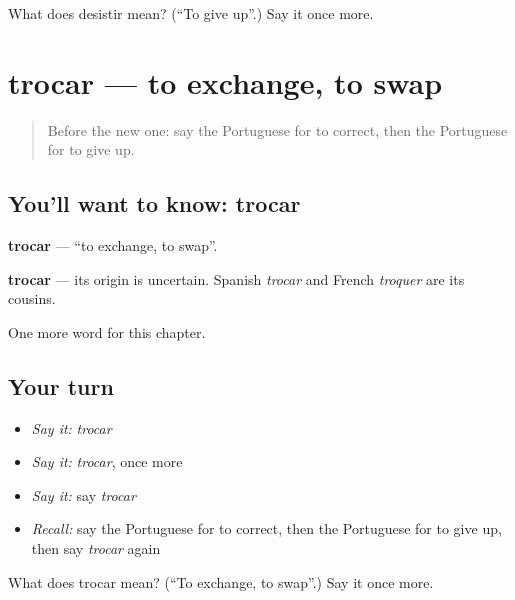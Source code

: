\begin{tcolorbox}[breakable,colback=teal!4,colframe=teal!35!black,title={Before you move on}]
What does desistir mean? (\textquotedblleft{}To give up\textquotedblright{}.) Say it once more.
\end{tcolorbox}
\section[trocar]{trocar — to exchange, to swap}

\label{lesson:PT-C208-trocar}



\begin{quote}
Before the new one: say the Portuguese for to correct, then the Portuguese for to give up.
\end{quote}

\subsection*{You'll want to know: trocar}
\textbf{trocar} — \textquotedblleft{}to exchange, to swap\textquotedblright{}.

\begin{cousinweb}
\textbf{trocar} — its origin is uncertain. Spanish \emph{trocar} and French \emph{troquer} are its cousins.
\end{cousinweb}

\begin{grammarlens}[title={What you've built}]
One more word for this chapter.
\end{grammarlens}

\subsection*{Your turn}
\begin{itemize}
\raggedright
  \item \emph{Say it:} \emph{trocar}
  \item \emph{Say it:} \emph{trocar}, once more
  \item \emph{Say it:} say \emph{trocar}
  \item \emph{Recall:} say the Portuguese for to correct, then the Portuguese for to give up, then say \emph{trocar} again
\end{itemize}

\begin{tcolorbox}[breakable,colback=teal!4,colframe=teal!35!black,title={Before you move on}]
What does trocar mean? (\textquotedblleft{}To exchange, to swap\textquotedblright{}.) Say it once more.
\end{tcolorbox}
